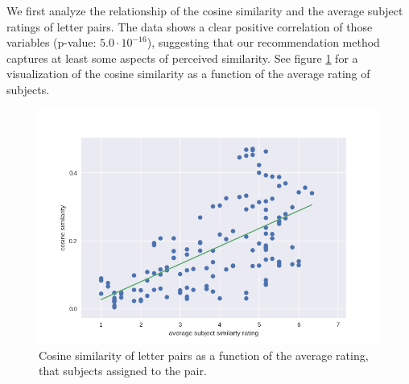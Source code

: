 We first analyze the relationship of the cosine similarity and the average subject ratings of letter pairs. The data shows a clear positive correlation of those variables (p-value: $5.0\cdot10^{-16}$), suggesting that our recommendation method captures at least some aspects of perceived similarity. See figure \ref{fig:sim_vs_rating} for a visualization of the cosine similarity as a function of the average rating of subjects.



\begin{figure}
	\includegraphics[width=\linewidth]{figures/similarity_vs_rating}
	\caption{Cosine similarity of letter pairs as a function of the average rating, that subjects assigned to the pair.}
	\label{fig:sim_vs_rating}
\end{figure}

